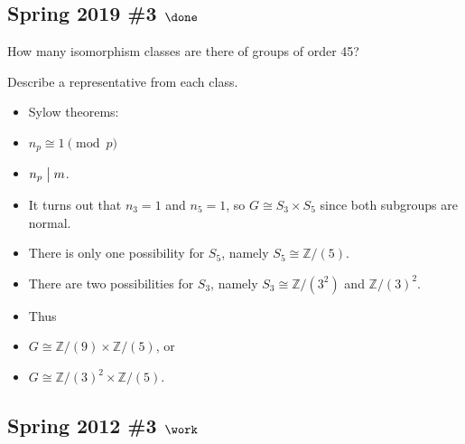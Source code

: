 
\hypertarget{spring-2019-3-done}{%
\subsection{\texorpdfstring{Spring 2019 \#3
\(\done\)}{Spring 2019 \#3 \textbackslash done}}\label{spring-2019-3-done}}

How many isomorphism classes are there of groups of order 45?

Describe a representative from each class.

\begin{concept}

\envlist

\begin{itemize}
\tightlist
\item
  Sylow theorems:
\item
  \(n_p \cong 1 \pmod p\)
\item
  \(n_p \bigm|m\).
\end{itemize}

\end{concept}

\begin{solution}

\envlist

\begin{itemize}
\item
  It turns out that \(n_3 = 1\) and \(n_5 = 1\), so
  \(G \cong S_3 \times S_5\) since both subgroups are normal.
\item
  There is only one possibility for \(S_5\), namely
  \(S_5\cong {\mathbb{Z}}/(5)\).
\item
  There are two possibilities for \(S_3\), namely
  \(S_3 \cong {\mathbb{Z}}/(3^2)\) and \({\mathbb{Z}}/(3)^2\).
\item
  Thus
\item
  \(G \cong {\mathbb{Z}}/(9) \times{\mathbb{Z}}/(5)\), or
\item
  \(G \cong {\mathbb{Z}}/(3)^2 \times{\mathbb{Z}}/(5)\).
\end{itemize}

\end{solution}


\hypertarget{spring-2012-3-work}{%
\subsection{\texorpdfstring{Spring 2012 \#3
\(\work\)}{Spring 2012 \#3 \textbackslash work}}\label{spring-2012-3-work}}

